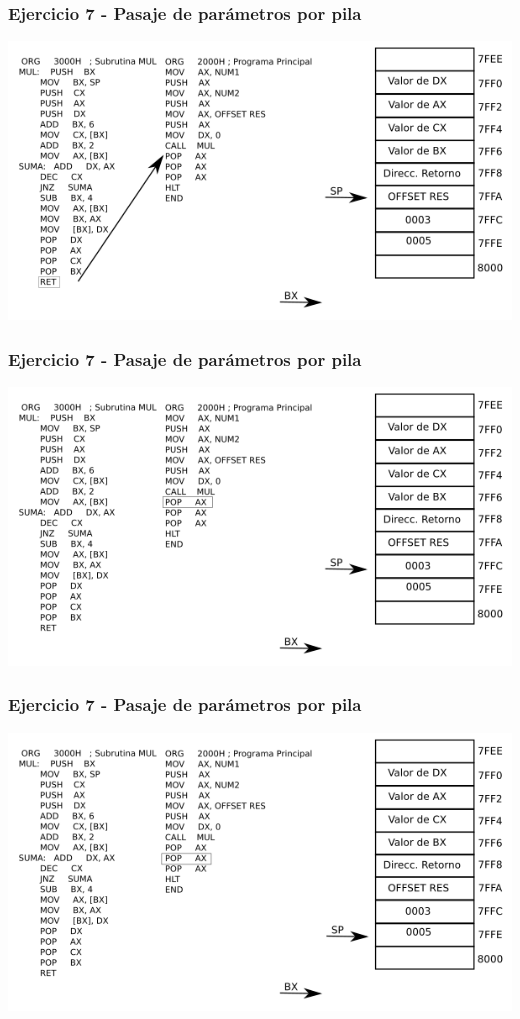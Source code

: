 \documentclass{beamer}
\begin{document}
\begin{frame}
\frametitle{Ejercicio 7 - Pasaje de parámetros por pila}
\includegraphics[scale=0.70]{imgs/imagen_018.png}
\end{frame}

\begin{frame}
\frametitle{Ejercicio 7 - Pasaje de parámetros por pila}
\includegraphics[scale=0.70]{imgs/imagen_019.png}
\end{frame}

\begin{frame}
\frametitle{Ejercicio 7 - Pasaje de parámetros por pila}
\includegraphics[scale=0.70]{imgs/imagen_020.png}
\end{frame}
\end{document}
